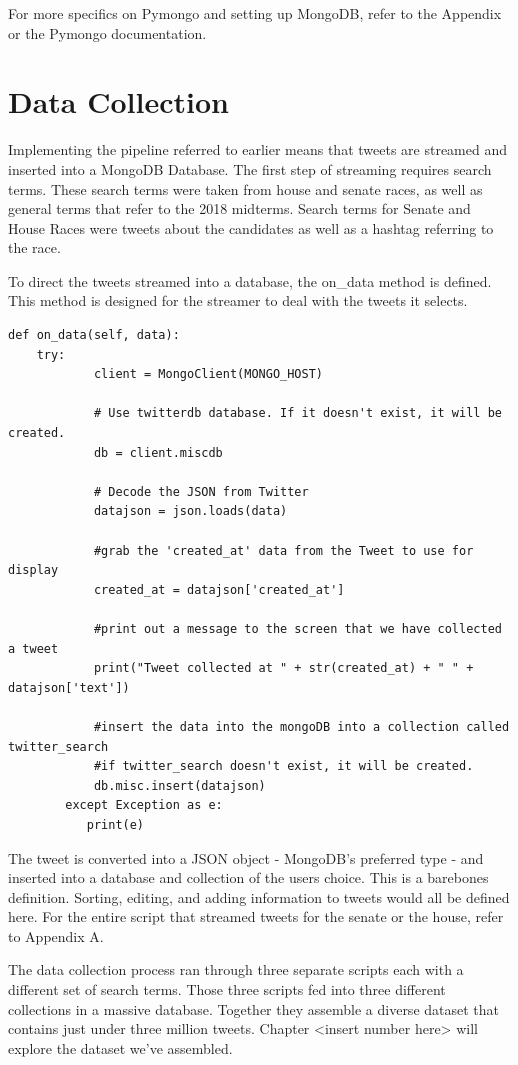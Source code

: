 \documentclass[11pt, twoside, reqno]{article}
\begin{document}
For more specifics on Pymongo and setting up MongoDB, refer to the Appendix or the Pymongo documentation.

\section{Data Collection}
\hspace{0.1in} 
Implementing the pipeline referred to earlier means that tweets are streamed and inserted into a MongoDB Database. The first step of streaming requires search terms. These search terms were taken from house and senate races, as well as general terms that refer to the 2018 midterms. Search terms for Senate and House Races were tweets about the candidates as well as a hashtag referring to the race. 

To direct the tweets streamed into a database, the on\_data method is defined. This method is designed for the streamer to deal with the tweets it selects.

\begin{verbatim}
def on_data(self, data):
	try:
            client = MongoClient(MONGO_HOST)

            # Use twitterdb database. If it doesn't exist, it will be created.
            db = client.miscdb

            # Decode the JSON from Twitter
            datajson = json.loads(data)

            #grab the 'created_at' data from the Tweet to use for display
            created_at = datajson['created_at']

            #print out a message to the screen that we have collected a tweet
            print("Tweet collected at " + str(created_at) + " " + datajson['text'])

            #insert the data into the mongoDB into a collection called twitter_search
            #if twitter_search doesn't exist, it will be created.
            db.misc.insert(datajson)
        except Exception as e:
           print(e)
\end{verbatim}

The tweet is converted into a JSON object - MongoDB's preferred type - and inserted into a database and collection of the users choice. This is a barebones definition. Sorting, editing, and adding information to tweets would all be defined here. For the entire script that streamed tweets for the senate or the house, refer to Appendix A.

The data collection process ran through three separate scripts each with a different set of search terms. Those three scripts fed into three different collections in a massive database. Together they assemble a diverse dataset that contains just under three million tweets. Chapter <insert number here> will explore the dataset we've assembled. 
\end{document}
